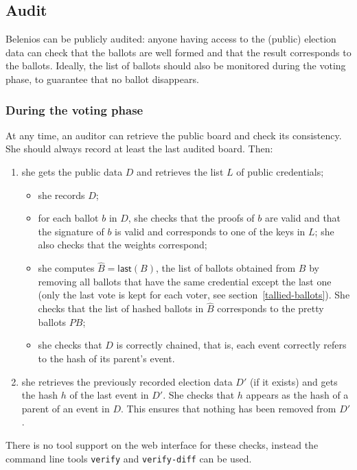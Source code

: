 \documentclass[a4paper]{article}
\begin{document}
\subsection{Audit}

Belenios can be publicly audited: anyone having access to the (public)
election data can check that the ballots are well formed and that the
result corresponds to the ballots. Ideally, the list of ballots should
also be monitored during the voting phase, to guarantee that no ballot
disappears.

\subsubsection{During the voting phase}
\label{sec:audit-voting}
At any time, an auditor can retrieve the public board and check its consistency. She should
always record at least the last audited board. Then:
\begin{enumerate}
\item she gets the public data $D$ and retrieves the list $L$ of
  public credentials;
  \begin{itemize}
  \item she records $D$;
  \item for each ballot $b$ in $D$, she checks that the proofs of $b$ are valid and that
  the signature of $b$ is valid and corresponds to one of the keys in
  $L$; she also checks that the weights correspond;
\item she computes $\hat{B}=\textsf{last}(B)$, the list of ballots
  obtained from $B$ by removing all ballots that have the same
  credential except the last one (only the last vote is kept for each
  voter, see section~\ref{tallied-ballots}). She checks that the list
  of hashed ballots in $\hat{B}$ corresponds to the pretty ballots
  $PB$;
  \item she checks that $D$ is correctly chained, that is, each event correctly
    refers to the hash of its parent's event.
  \end{itemize}
\item she retrieves the previously recorded election data $D'$ (if it
  exists) and gets the hash $h$ of the last event in $D'$.
She checks that $h$ appears as the hash of a parent of an event in
$D$.
This ensures that nothing has been removed from $D'$.
\end{enumerate}

There is no tool support on the web interface for these checks,
instead the command line tools \texttt{verify} and \texttt{verify-diff} can be used.
\end{document}

